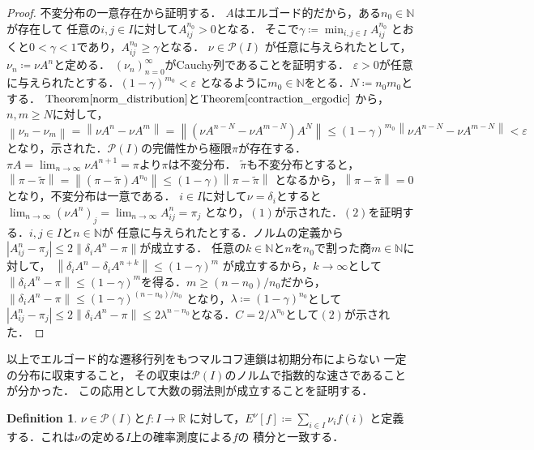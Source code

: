 \documentclass[dvipdfmx,autodetect-engine]{jsarticle}
\theoremstyle{remark}
\theoremstyle{definition}
\newtheorem{definition}{Definition}[section]
\newcommand{\R}{\mathbb{R}}
\newcommand{\N}{\mathbb{N}}
\newcommand{\abs}[1]{\left\lvert#1\right\rvert}%
\newcommand{\norm}[1]{\left\lVert#1\right\rVert}%
\begin{document}
\begin{proof}
    不変分布の一意存在から証明する．
    $A$はエルゴード的だから，ある$n_0 \in \N$が存在して
    任意の$i,j \in I$に対して$A_{ij}^{n_0} >0$となる．
    そこで$\gamma \coloneqq \min_{i,j \in I} A_{ij}^{n_0}$
    とおくと$0 < \gamma < 1$であり，$A_{ij}^{n_0}\geq \gamma$となる．
    $\nu \in \mathcal{P}(I)$
    が任意に与えられたとして，$\nu_{n} \coloneqq \nu A^n$と定める．
    $(\nu_n)_{n = 0}^{\infty}$がCauchy列であることを証明する．
    $\varepsilon>0$が任意に与えられたとする．$(1-\gamma)^{m_0} < \varepsilon$
    となるように$m_0 \in \N$をとる．$N \coloneqq n_0 m_0$とする．
    $\mathrm{Theorem}\ref{norm_distribution}$と$\mathrm{Theorem}\ref{contraction_ergodic}$
    から，$n,m \geq N$に対して，$\norm{\nu_{n} - \nu_{m}} = 
    \norm{\nu A^{n} - \nu A^{m}} = \norm{(\nu A^{n - N} - \nu A^{m - N})A^N}
    \leq (1-\gamma)^{m_0} \norm{\nu A^{n-N} - \nu A^{m-N}} < \varepsilon$
    となり，示された．$\mathcal{P}(I)$の完備性から極限$\pi$が存在する．
    $\pi A= \lim_{n \to \infty} \nu A^{n+1} = \pi$より$\pi$は不変分布．
    $\tilde{\pi}$も不変分布とすると，$\norm{\pi - \tilde{\pi}} = 
    \norm{(\pi - \tilde{\pi})A^{n_0}} \leq (1-\gamma)\norm{\pi - \tilde{\pi}}$
    となるから，$\norm{\pi - \tilde{\pi}} = 0$となり，不変分布は一意である．
    $i \in I$に対して$\nu = \delta_{i}$とすると
    $\lim_{n \to \infty} (\nu A^n)_{j} = \lim_{n \to \infty} A_{ij}^n = \pi_j$
    となり，$(1)$が示された．$(2)$を証明する．$i,j \in I$と$n \in \N$が
    任意に与えられたとする．ノルムの定義から
    $\abs{A_{ij}^n - \pi_{j}} \leq 2\norm{\delta_{i}A^n - \pi}$が成立する．
    任意の$k \in \N$と$n$を$n_0$で割った商$m \in \N$に対して，
    $\norm{\delta_{i} A^n - \delta_{i} A^{n+k}} \leq (1-\gamma)^{m}$
    が成立するから，$k \to \infty$として$\norm{\delta_{i}A^n - \pi} \leq
    (1-\gamma)^m$を得る．$m \geq (n-n_0)/n_0$だから，
    $\norm{\delta_{i}A^n - \pi} \leq(1-\gamma)^{(n-n_0)/n_0}$
    となり，$\lambda \coloneqq (1-\gamma)^{n_0}$として
    $\abs{A_{ij}^n - \pi_{j}} \leq 2\norm{\delta_{i}A^n - \pi} \leq
    2\lambda^{n-n_0}$となる．$C = 2/\lambda^{n_0}$として$(2)$が示された．
\end{proof}


以上でエルゴード的な遷移行列をもつマルコフ連鎖は初期分布によらない
一定の分布に収束すること，
その収束は$\mathcal{P}(I)$のノルムで指数的な速さであることが分かった．
この応用として大数の弱法則が成立することを証明する．


\begin{definition}
    $\nu \in \mathcal{P}(I)$と$f \colon I \to \R$
    に対して，$E^{\nu}[f] \coloneqq \sum_{i \in I} \nu_{i} f(i)$
    と定義する．これは$\nu$の定める$I$上の確率測度による$f$の
    積分と一致する．
\end{definition}
\end{document}
